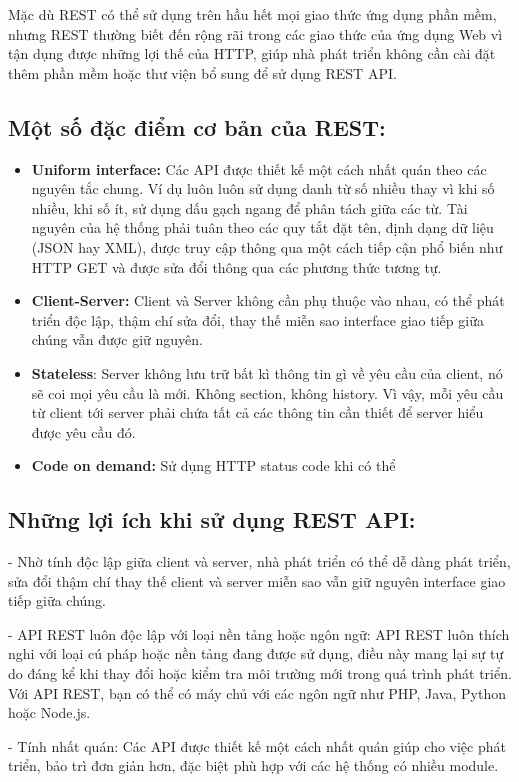 Mặc dù REST có thể sử dụng trên hầu hết mọi giao thức ứng dụng phần mềm, nhưng REST thường biết đến rộng rãi trong các giao thức của ứng dụng Web vì tận dụng được những lợi thế của HTTP, giúp nhà phát triển không cần cài đặt thêm phần mềm hoặc thư viện bổ sung để sử dụng REST API.

\subsection{Một số đặc điểm cơ bản của REST:}
\begin{itemize}
    \item \textbf{Uniform interface:} Các API được thiết kế một cách nhất quán theo các nguyên tắc chung. Ví dụ luôn luôn sử dụng danh từ số nhiều thay vì khi số nhiều, khi số ít, sử dụng dấu gạch ngang để phân tách giữa các từ. Tài nguyên của hệ thống phải tuân theo các quy tắt đặt tên, định dạng dữ liệu (JSON hay XML), được truy cập thông qua một cách tiếp cận phổ biến như HTTP GET và được sửa đổi thông qua các phương thức tương tự.
    \item \textbf{Client-Server:} Client và Server không cần phụ thuộc vào nhau, có thể phát triển độc lập, thậm chí sửa đổi, thay thế miễn sao interface giao tiếp giữa chúng vẫn được giữ nguyên.
    \item \textbf{Stateless}: Server không lưu trữ bất kì thông tin gì về yêu cầu của client, nó sẽ coi mọi yêu cầu là mới. Không section, không history. Vì vậy, mỗi yêu cầu từ client tới server phải chứa tất cả các thông tin cần thiết để  server hiểu được yêu cầu đó.
    \item \textbf{Code on demand:} Sử dụng HTTP status code khi có thể
\end{itemize}


\subsection{Những lợi ích khi sử dụng REST API:}

- Nhờ tính độc lập giữa client và server, nhà phát triển có thể dễ dàng phát triển, sửa đổi thậm chí thay thế client và server miễn sao vẫn giữ nguyên interface giao tiếp giữa chúng.

- API REST luôn độc lập với loại nền tảng hoặc ngôn ngữ: API REST luôn thích nghi với loại cú pháp hoặc nền tảng đang được sử dụng, điều này mang lại sự tự do đáng kể khi thay đổi hoặc kiểm tra môi trường mới trong quá trình phát triển. Với API REST, bạn có thể có máy chủ với các ngôn ngữ như PHP, Java, Python hoặc Node.js.

- Tính nhất quán: Các API được thiết kế một cách nhất quán giúp cho việc phát triển, bảo trì đơn giản hơn, đặc biệt phù hợp với các hệ thống có nhiều module.